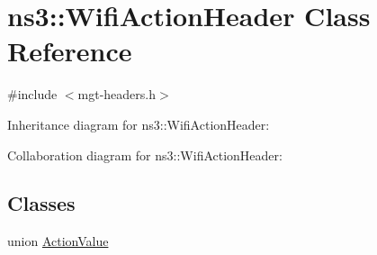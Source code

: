\hypertarget{classns3_1_1WifiActionHeader}{}\section{ns3\+:\+:Wifi\+Action\+Header Class Reference}
\label{classns3_1_1WifiActionHeader}


{\ttfamily \#include $<$mgt-\/headers.\+h$>$}



Inheritance diagram for ns3\+:\+:Wifi\+Action\+Header\+:


Collaboration diagram for ns3\+:\+:Wifi\+Action\+Header\+:
\subsection*{Classes}
\begin{DoxyCompactItemize}
\item 
union \hyperlink{unionns3_1_1WifiActionHeader_1_1ActionValue}{Action\+Value}
\end{DoxyCompactItemize}
